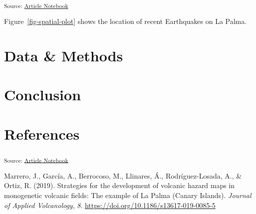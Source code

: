 \documentclass[
]{agujournal2019}
\newlength{\cslhangindent}
\newenvironment{CSLReferences}[2] %
 {\begin{list}{}{%
  \setlength{\itemindent}{0pt}
  \setlength{\leftmargin}{0pt}
  \setlength{\parsep}{0pt}
  \ifodd #1
   \setlength{\leftmargin}{\cslhangindent}
   \setlength{\itemindent}{-1\cslhangindent}
  \fi
  \setlength{\itemsep}{#2\baselineskip}}}
 {\end{list}}
\begin{document}
\textsubscript{Source:
\href{https://ehealy19.github.io/Matching_Movies_Manuscript/index.qmd.html}{Article
Notebook}}

Figure~\ref{fig-spatial-plot} shows the location of recent Earthquakes
on La Palma.

\section{Data \& Methods}\label{sec-data-methods}

\section{Conclusion}\label{conclusion}

\section*{References}\label{references}

\vspace{1em}

\textsubscript{Source:
\href{https://ehealy19.github.io/Matching_Movies_Manuscript/index.qmd.html}{Article
Notebook}}

\label{refs}
\begin{CSLReferences}{1}{0}
Marrero, J., García, A., Berrocoso, M., Llinares, Á., Rodríguez-Losada,
A., \& Ortiz, R. (2019). Strategies for the development of volcanic
hazard maps in monogenetic volcanic fields: The example of {La} {Palma}
({Canary} {Islands}). \emph{Journal of Applied Volcanology}, \emph{8}.
\url{https://doi.org/10.1186/s13617-019-0085-5}

\end{CSLReferences}
\end{document}
